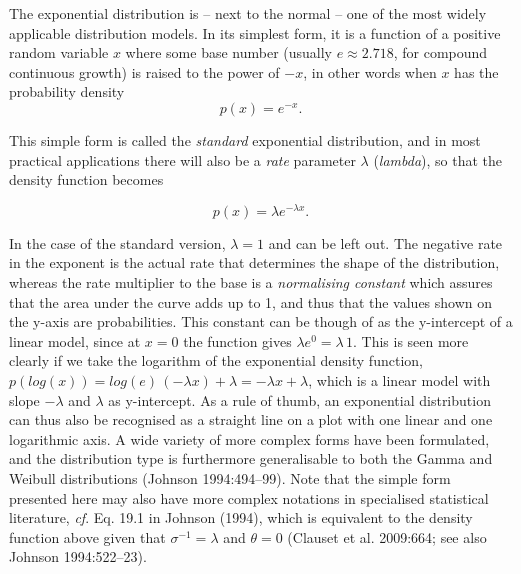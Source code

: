 \documentclass[
  12pt,
]{book}
\begin{document}
The exponential distribution is -- next to the normal -- one of the most widely applicable distribution models. In its simplest form, it is a function of a positive random variable \(x\) where some base number (usually \(e \approx 2.718\), for compound continuous growth) is raised to the power of \(-x\), in other words when \(x\) has the probability density \[p(x) = e^{-x}.\]

This simple form is called the \emph{standard} exponential distribution, and in most practical applications there will also be a \emph{rate} parameter \(\lambda\) (\emph{lambda}), so that the density function becomes

\begin{equation} p(x) = \lambda e^{-\lambda x}.
\label{eq:exponential}
\end{equation}

In the case of the standard version, \(\lambda = 1\) and can be left out. The negative rate in the exponent is the actual rate that determines the shape of the distribution, whereas the rate multiplier to the base is a \emph{normalising constant} which assures that the area under the curve adds up to 1, and thus that the values shown on the y-axis are probabilities. This constant can be though of as the y-intercept of a linear model, since at \(x = 0\) the function gives \(\lambda e^0 = \lambda\,1\). This is seen more clearly if we take the logarithm of the exponential density function, \(p(log(x)) = log(e)\,(-\lambda x) + \lambda = -\lambda x+\lambda\), which is a linear model with slope \(-\lambda\) and \(\lambda\) as y-intercept. As a rule of thumb, an exponential distribution can thus also be recognised as a straight line on a plot with one linear and one logarithmic axis. A wide variety of more complex forms have been formulated, and the distribution type is furthermore generalisable to both the Gamma and Weibull distributions (Johnson 1994:494--99). Note that the simple form presented here may also have more complex notations in specialised statistical literature, \emph{cf}. Eq. 19.1 in Johnson (1994), which is equivalent to the density function above given that \(\sigma^{-1} = \lambda\) and \(\theta = 0\) (Clauset et al. 2009:664; see also Johnson 1994:522--23).
\end{document}
